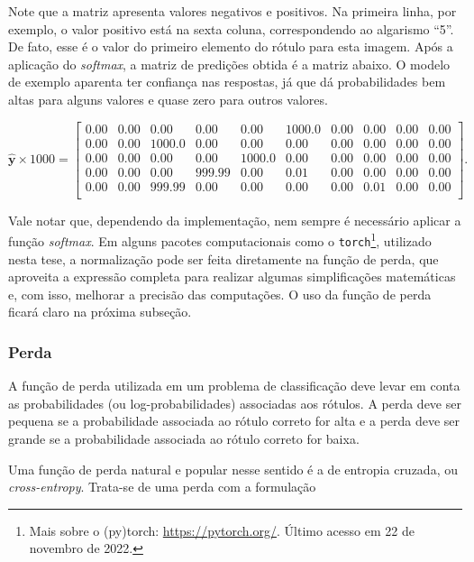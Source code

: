 \documentclass[12pt,twoside,brazilian]{book}
\begin{document}
Note que a matriz apresenta valores negativos e positivos. Na primeira
linha, por exemplo, o valor positivo está na sexta coluna,
correspondendo ao algarismo ``5''. De fato, esse é o valor do primeiro
elemento do rótulo para esta imagem. Após a aplicação do \emph{softmax},
a matriz de predições obtida é a matriz abaixo. O modelo de exemplo
aparenta ter confiança nas respostas, já que dá probabilidades bem altas
para alguns valores e quase zero para outros valores.

\[
\hat{\mathbf y}\times 1000 = \left[\begin{array}{rrrrrrrrrr}
  0.00 & 0.00 & 0.00 & 0.00 & 0.00 & 1000.0 & 0.00 & 0.00 & 0.00 & 0.00 \\ 
  0.00 & 0.00 & 1000.0 & 0.00 & 0.00 & 0.00 & 0.00 & 0.00 & 0.00 & 0.00 \\ 
  0.00 & 0.00 & 0.00 & 0.00 & 1000.0 & 0.00 & 0.00 & 0.00 & 0.00 & 0.00 \\ 
  0.00 & 0.00 & 0.00 & 999.99 & 0.00 & 0.01 & 0.00 & 0.00 & 0.00 & 0.00 \\ 
  0.00 & 0.00 & 999.99 & 0.00 & 0.00 & 0.00 & 0.00 & 0.01 & 0.00 & 0.00 \\
\end{array}\right].
\]

Vale notar que, dependendo da implementação, nem sempre é necessário
aplicar a função \emph{softmax}. Em alguns pacotes computacionais como o
\texttt{torch}\footnote{Mais sobre o (py)torch:
  \url{https://pytorch.org/}. Último acesso em 22 de novembro de 2022.},
utilizado nesta tese, a normalização pode ser feita diretamente na
função de perda, que aproveita a expressão completa para realizar
algumas simplificações matemáticas e, com isso, melhorar a precisão das
computações. O uso da função de perda ficará claro na próxima subseção.

\hypertarget{perda}{%
\subsubsection{Perda}\label{perda}}

A função de perda utilizada em um problema de classificação deve levar
em conta as probabilidades (ou log-probabilidades) associadas aos
rótulos. A perda deve ser pequena se a probabilidade associada ao rótulo
correto for alta e a perda deve ser grande se a probabilidade associada
ao rótulo correto for baixa.

Uma função de perda natural e popular nesse sentido é a de entropia
cruzada, ou \emph{cross-entropy}. Trata-se de uma perda com a formulação
\end{document}
